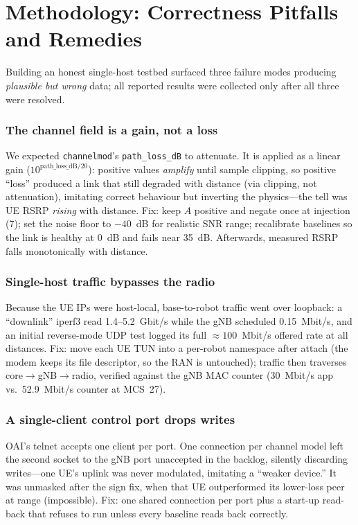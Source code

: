 \documentclass[10pt, conference]{IEEEtran}
\begin{document}
\section{Methodology: Correctness Pitfalls and Remedies}
\label{sec:pitfalls}
Building an honest single-host testbed surfaced three failure modes producing \emph{plausible but wrong} data; all reported results were collected only after all three were resolved.

\subsubsection{The channel field is a gain, not a loss}
We expected \texttt{channelmod}'s \texttt{path\_loss\_dB} to attenuate. It is applied as a linear gain ($10^{\mathrm{path\_loss\_dB}/20}$): positive values \emph{amplify} until sample clipping, so positive ``loss'' produced a link that still degraded with distance (via clipping, not attenuation), imitating correct behaviour but inverting the physics---the tell was UE RSRP \emph{rising} with distance. Fix: keep $A$ positive and negate once at injection (7); set the noise floor to $-40$~dB for realistic SNR range; recalibrate baselines so the link is healthy at 0~dB and fails near 35~dB. Afterwards, measured RSRP falls monotonically with distance.

\subsubsection{Single-host traffic bypasses the radio}
Because the UE IPs were host-local, base-to-robot traffic went over loopback: a ``downlink'' iperf3 read 1.4--5.2~Gbit/s while the gNB scheduled 0.15~Mbit/s, and an initial reverse-mode UDP test logged its full ${\approx}100$~Mbit/s offered rate at all distances. Fix: move each UE TUN into a per-robot namespace after attach (the modem keeps its file descriptor, so the RAN is untouched); traffic then traverses core$\rightarrow$gNB$\rightarrow$radio, verified against the gNB MAC counter (30~Mbit/s app vs.\ 52.9~Mbit/s counter at MCS~27).

\subsubsection{A single-client control port drops writes}
OAI's telnet accepts one client per port. One connection per channel model left the second socket to the gNB port unaccepted in the backlog, silently discarding writes---one UE's uplink was never modulated, imitating a ``weaker device.'' It was unmasked after the sign fix, when that UE outperformed its lower-loss peer at range (impossible). Fix: one shared connection per port plus a start-up read-back that refuses to run unless every baseline reads back correctly.
\end{document}
